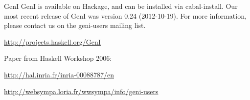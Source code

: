\begin{hcarentry}{GenI}
GenI is available on Hackage, and can be installed via cabal-install.
Our most recent release of GenI was version 0.24 (2012-10-19). For more
information, please contact us on the geni-users mailing list.

\FurtherReading
\begin{compactitem}
\item \url{http://projects.haskell.org/GenI}
\item Paper from Haskell Workshop 2006:

\url{http://hal.inria.fr/inria-00088787/en}
\item \url{http://websympa.loria.fr/wwsympa/info/geni-users}
\end{compactitem}
\end{hcarentry}
